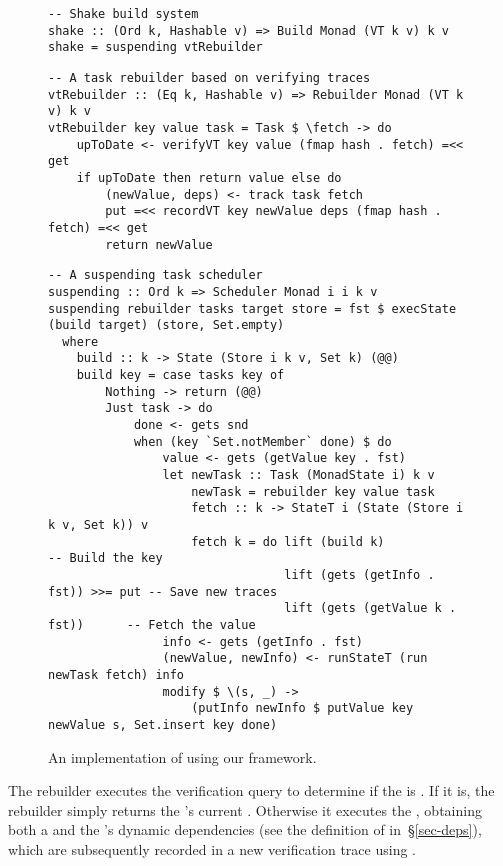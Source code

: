 \begin{figure}
\begin{verbatim}
-- Shake build system
shake :: (Ord k, Hashable v) => Build Monad (VT k v) k v
shake = suspending vtRebuilder
\end{verbatim}
\vspace{0mm}
\begin{verbatim}
-- A task rebuilder based on verifying traces
vtRebuilder :: (Eq k, Hashable v) => Rebuilder Monad (VT k v) k v
vtRebuilder key value task = Task $ \fetch -> do
    upToDate <- verifyVT key value (fmap hash . fetch) =<< get
    if upToDate then return value else do
        (newValue, deps) <- track task fetch
        put =<< recordVT key newValue deps (fmap hash . fetch) =<< get
        return newValue
\end{verbatim}
\vspace{0mm}
\begin{verbatim}
-- A suspending task scheduler
suspending :: Ord k => Scheduler Monad i i k v
suspending rebuilder tasks target store = fst $ execState (build target) (store, Set.empty)
  where
    build :: k -> State (Store i k v, Set k) (@@)
    build key = case tasks key of
        Nothing -> return (@@)
        Just task -> do
            done <- gets snd
            when (key `Set.notMember` done) $ do
                value <- gets (getValue key . fst)
                let newTask :: Task (MonadState i) k v
                    newTask = rebuilder key value task
                    fetch :: k -> StateT i (State (Store i k v, Set k)) v
                    fetch k = do lift (build k)                      -- Build the key
                                 lift (gets (getInfo . fst)) >>= put -- Save new traces
                                 lift (gets (getValue k . fst))      -- Fetch the value
                info <- gets (getInfo . fst)
                (newValue, newInfo) <- runStateT (run newTask fetch) info
                modify $ \(s, _) ->
                    (putInfo newInfo $ putValue key newValue s, Set.insert key done)
\end{verbatim}
\vspace{-3mm}
\caption{An implementation of \Shake using our framework.}\label{fig-shake-implementation}
\vspace{-6mm}
\end{figure}

The rebuilder executes the verification query  to determine if the
 is . If it is, the rebuilder simply returns the 's
current . Otherwise it executes the , obtaining both a
 and the 's dynamic dependencies  (see the
definition of  in~\S\ref{sec-deps}), which are subsequently recorded
in a new verification trace using .


